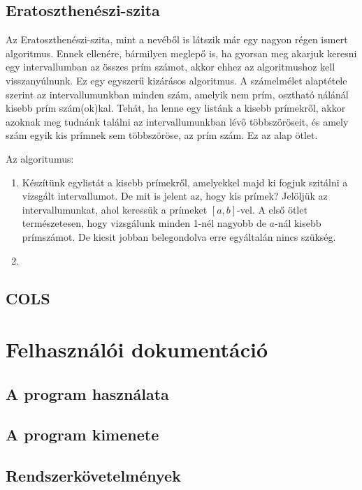 \documentclass[twoside, a4paper, 12pt]{article}
\begin{document}
\subsection{Eratoszthenészi-szita}

Az Eratoszthenészi-szita, mint a nevéből is látszik már egy nagyon régen ismert algoritmus. Ennek ellenére, bármilyen meglepő is, ha gyorsan meg akarjuk keresni egy intervallumban az összes prím számot, akkor ehhez az algoritmushoz kell visszanyúlnunk. Ez egy egyszerű kizárásos algoritmus. A számelmélet alaptétele szerint az intervallumunkban minden szám, amelyik nem prím, osztható nálánál kisebb prím szám(ok)kal. Tehát, ha lenne egy listánk a kisebb prímekről, akkor azoknak meg tudnánk találni az intervallumunkban lévő többszöröseit, és amely szám egyik kis prímnek sem többszöröse, az prím szám. Ez az alap ötlet. \par
Az algoritumus: \par
\begin{enumerate}
\item Készítünk egylistát a kisebb prímekről, amelyekkel majd ki fogjuk szitálni a vizsgált intervallumot. De mit is jelent az, hogy kis prímek? Jelöljük az intervallumunkat, ahol keressük a prímeket \( [a, b] \)-vel. A első ötlet természetesen, hogy vizsgálunk minden 1-nél nagyobb de \(a\)-nál kisebb prímszámot. De kicsit jobban belegondolva erre egyáltalán nincs szükség. 
\item 
\end{enumerate}


\subsection{COLS}

\clearpage
\section{Felhasználói dokumentáció}

\subsection{A program használata}

\subsection{A program kimenete}

\subsection{Rendszerkövetelmények}
\end{document}
